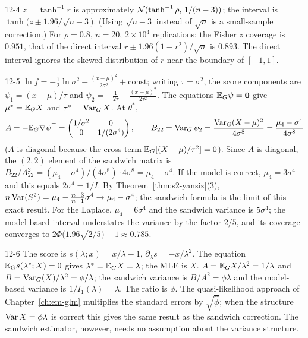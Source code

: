 \begin{solution}{12-4}
$z=\tanh^{-1}r$ is approximately $\mathcal{N}(\tanh^{-1}\rho,\,1/(n-3))$; the interval is $\tanh\big(z\pm1.96/\sqrt{n-3}\big)$. (Using $\sqrt{n-3}$ instead of $\sqrt n$ is a small-sample correction.) For $\rho=0.8$, $n=20$, $2\times10^4$ replications: the Fisher $z$ coverage is $0.951$, that of the direct interval $r\pm1.96(1-r^2)/\sqrt n$ is $0.893$. The direct interval ignores the skewed distribution of $r$ near the boundary of $[-1,1]$.
\end{solution}

\begin{solution}{12-5}
$\ln f=-\frac12\ln\sigma^2-\frac{(x-\mu)^2}{2\sigma^2}+\text{const}$; writing $\tau=\sigma^2$, the score components are $\psi_1=(x-\mu)/\tau$ and $\psi_2=-\frac1{2\tau}+\frac{(x-\mu)^2}{2\tau^2}$. The equations $\mathbb{E}_G\psi=\mathbf 0$ give $\mu^*=\mathbb{E}_GX$ and $\tau^*=\operatorname{Var}_GX$. At $\theta^*$,
\[
A=-\mathbb{E}_G\nabla\psi^\top=\begin{pmatrix}1/\sigma^2&0\\0&1/(2\sigma^4)\end{pmatrix},\qquad
B_{22}=\operatorname{Var}_G\psi_2=\frac{\operatorname{Var}_G(X-\mu)^2}{4\sigma^8}=\frac{\mu_4-\sigma^4}{4\sigma^8}
\]
($A$ is diagonal because the cross term $\mathbb{E}_G[(X-\mu)/\tau^2]=0$). Since $A$ is diagonal, the $(2,2)$ element of the sandwich matrix is $B_{22}/A_{22}^2=(\mu_4-\sigma^4)/(4\sigma^8)\cdot4\sigma^8=\mu_4-\sigma^4$. If the model is correct, $\mu_4=3\sigma^4$ and this equals $2\sigma^4=1/I$. By Theorem~\ref{thm:s2-yansiz}(3), $n\operatorname{Var}(S^2)=\mu_4-\frac{n-3}{n-1}\sigma^4\to\mu_4-\sigma^4$; the sandwich formula is the limit of this exact result. For the Laplace, $\mu_4=6\sigma^4$ and the sandwich variance is $5\sigma^4$; the model-based interval understates the variance by the factor $2/5$, and its coverage converges to $2\Phi\big(1.96\sqrt{2/5}\big)-1\approx0.785$.
\end{solution}

\begin{solution}{12-6}
The score is $s(\lambda;x)=x/\lambda-1$, $\partial_\lambda s=-x/\lambda^2$. The equation $\mathbb{E}_Gs(\lambda^*;X)=0$ gives $\lambda^*=\mathbb{E}_GX=\lambda$; the MLE is $\bar X$. $A=\mathbb{E}_GX/\lambda^2=1/\lambda$ and $B=\operatorname{Var}_G(X)/\lambda^2=\phi/\lambda$; the sandwich variance is $B/A^2=\phi\lambda$ and the model-based variance is $1/I_1(\lambda)=\lambda$. The ratio is $\phi$. The quasi-likelihood approach of Chapter~\ref{ch:em-glm} multiplies the standard errors by $\sqrt{\hat\phi}$; when the structure $\operatorname{Var} X=\phi\lambda$ is correct this gives the same result as the sandwich correction. The sandwich estimator, however, needs no assumption about the variance structure.
\end{solution}

